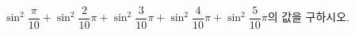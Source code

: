 $\sin^2\dfrac{\pi}{10}+\sin^2\dfrac{2}{10}\pi+\sin^2\dfrac{3}{10}\pi+\sin^2\dfrac{4}{10}\pi+\sin^2\dfrac{5}{10}\pi$의 값을 구하시오.
